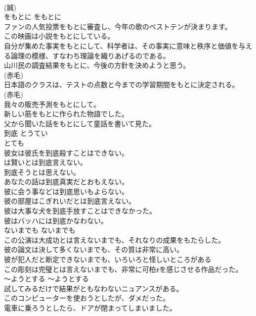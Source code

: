 \documentclass[8pt]{extreport}
\begin{document}
\begin{CJK}{UTF8}{min}
\\	(誠)
\\	をもとに	をもとに	
\\	ファンの人気投票をもとに審査し、今年の歌のベストテンが決まります。  
\\	この映画は小説をもとにしている。   
\\	自分が集めた事実をもとにして、科学者は、その事実に意味と秩序と価値を与える論理の模様、すなわち理論を織りあげるのである。  
\\	山川民の調査結果をもとに、今後の方針を決めようと思う。  
\\	(赤毛)
\\	日本語のクラスは、テストの点数と今までの学習期間をもとに決定される。  
\\	(赤毛)
\\	我々の販売予測をもとにして。  
\\	新しい筋をもとに作られた物語でした。   
\\	父から聞いた話をもとにして童話を書いて見た。  
\\	到底	とうてい	
\\	とても	
\\	彼女は彼氏を到底殺すことはできない。  
\\	は賢いとは到底言えない。  
\\	到底そうとは思えない。  
\\	あなたの話は到底真実だとおもえない。   
\\	彼に会う事などは到底思いもよらない。   
\\	彼の部屋はこぎれいだとは到底言えない。   
\\	彼は大事な犬を到底手放すことはできなかった。   
\\	彼はバッハには到底かなわない。  
\\	ないまでも	ないまでも	
\\	この公演は大成功とは言えないまでも、それなりの成果をもたらした。  
\\	彼の論文は決して多くないまでも、その質は非常に高い。   
\\	彼が犯人だと断定できないまでも、いろいろと怪しいところがある   
\\	この彫刻は完璧とは言えないまでも、非常に可柏ｫを感じさせる作品だった。   
\\	〜ようとする	〜ようとする	
\\	試してみるだけで結果がともなわないニュアンスがある。	
\\	このコンピューターを使おうとしたが、ダメだった。  
\\	電車に乗ろうとしたら、ドアが閉まってしまいました。  

\end{CJK}
\end{document}
